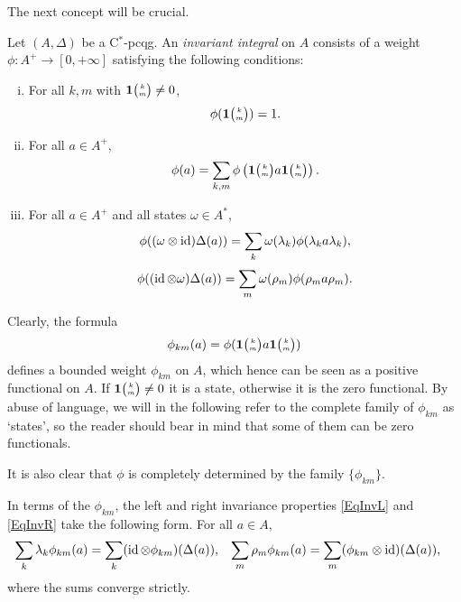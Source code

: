 The next concept will be crucial.
\begin{Def} Let $(A,\Delta)$ be a C$^*$-pcqg. An \emph{invariant integral} on $A$ consists of a weight $\phi: A^+ \rightarrow [0,+\infty]$ satisfying the following conditions:
\begin{enumerate}[i)]
\item For all $k,m$ with $\mathbf{1}{\tiny {\begin{pmatrix} k\\m\end{pmatrix}}}\neq 0$, \[\phi(\mathbf{1}{\tiny {\begin{pmatrix} k\\m\end{pmatrix}}}) = 1.\]
\item For all $a\in A^+$, \[\phi(a) = \sum_{k,m} \phi\left(\mathbf{1}{\tiny {\begin{pmatrix} k\\m\end{pmatrix}}}a\mathbf{1}{\tiny {\begin{pmatrix} k\\m\end{pmatrix}}}\right).\]
\item For all $a\in A^+$ and all states $\omega\in A^*$, \begin{equation}\label{EqInvL} \phi((\omega \otimes \operatorname{id})\Delta(a)) = \sum_{k} \omega(\lambda_k)\phi(\lambda_ka\lambda_k),\end{equation} \begin{equation}\label{EqInvR} \phi((\operatorname{id}\otimes \omega)\Delta(a)) = \sum_{m}\omega(\rho_m)\phi(\rho_ma\rho_m).\end{equation}
\end{enumerate} 
\end{Def}





Clearly, the formula \[\phi_{km}(a) = \phi(\mathbf{1}{\tiny {\begin{pmatrix} k\\m\end{pmatrix}}}a\mathbf{1}{\tiny {\begin{pmatrix} k\\m\end{pmatrix}}})\] defines a bounded weight $\phi_{km}$ on $A$, which hence can be seen as a positive functional on $A$. If $\mathbf{1}{\tiny {\begin{pmatrix} k\\m\end{pmatrix}}}\neq 0$ it is a state, otherwise it is the zero functional. By abuse of language, we will in the following refer to the complete family of $\phi_{km}$ as `states', so the reader should bear in mind that some of them can be zero functionals.

It is also clear that $\phi$ is completely determined by the family
$\{\phi_{km}\}$.  

In terms of the $\phi_{km}$, the left and right invariance properties
\eqref{EqInvL} and \eqref{EqInvR} take the following form.  For all
$a\in A$,
\begin{align} \label{eq:invariance}
\sum_{k}  \lambda_{k} \phi_{km}(a) &= \sum_{k}  (\operatorname{id} \otimes
\phi_{km})(\Delta(a)), &
\sum_{m} \rho_{m} \phi_{km}(a) &= \sum_{m} (\phi_{km} \otimes \operatorname{id})(\Delta(a)),
\end{align}
where the sums converge strictly.

